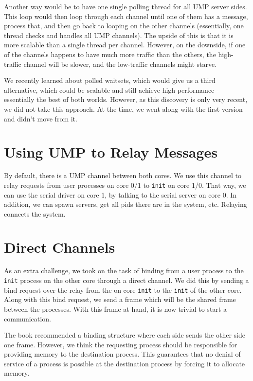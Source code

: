 Another way would be to have one single polling thread for all UMP server sides. This loop would then loop through each channel
until one of them has a message, process that, and then go back to looping on the other channels (essentially, one thread checks 
and handles all UMP channels). The upside of this is that it is more scalable than a single thread per channel. However, on the downside,
if one of the channels happens to have much more traffic than the others, the high-traffic channel will be slower, and the low-traffic 
channels might starve.

We recently learned about polled waitsets, which would give us a third alternative, which could be scalable and still achieve high performance -
essentially the best of both worlds. However, as this discovery is only very recent, we did not take this approach.
At the time, we went along with the first version and didn't move from it. 

\section{Using UMP to Relay Messages}
By default, there is a UMP channel between both cores. We use this channel to relay requests from user processes on core 0/1 
to \texttt{init} on core 1/0. That way, we can use the serial driver on core 1, by talking to the serial server on core 0.
In addition, we can spawn servers, get all pids there are in the system, etc. Relaying connects the system.

\section{Direct Channels}
As an extra challenge, we took on the task of binding from a user process to the \texttt{init} process on the other core through a direct 
channel. We did this by sending a bind request over the relay from the on-core \texttt{init} to the \texttt{init} of the other core.
Along with this bind request, we send a frame which will be the shared frame between the processes. With this frame at hand,
it is now trivial to start a communication.

The book recommended a binding structure where each side sends the other side one frame. However, we think the requesting process
should be responsible for providing memory to the destination process. This guarantees that no denial of service of a process
is possible at the destination process by forcing it to allocate memory.
